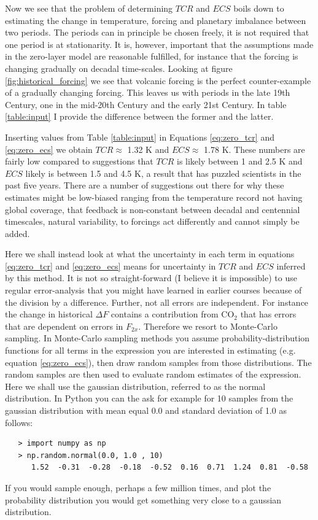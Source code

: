 \documentclass[12pt]{book}
\begin{document}
\noindent
Now we see that the problem of determining $TCR$ and $ECS$ boils down to estimating the change in temperature, forcing and planetary imbalance between two periods. The periods can in principle be chosen freely, it is not required that one period is at stationarity. It is, however, important that the assumptions made in the zero-layer model are reasonable fulfilled, for instance that the forcing is changing gradually on decadal time-scales. Looking at figure \ref{fig:historical_forcing} we see that volcanic forcing is the perfect counter-example of a gradually changing forcing. This leaves us with periods in the late 19th Century, one in the mid-20th Century and the early 21st Century. In table \ref{table:input} I provide the difference between the former and the latter. 


Inserting values from Table \ref{table:input} in Equations \ref{eq:zero_tcr} and \ref{eq:zero_ecs} we obtain $TCR \approx$ 1.32 K and $ECS \approx$ 1.78 K. These numbers are fairly low compared to suggestions that $TCR$ is likely between 1 and 2.5 K and $ECS$ likely is between 1.5 and 4.5 K, a result that has puzzled scientists in the past five years. There are a number of suggestions out there for why these estimates might be low-biased ranging from the temperature record not having global coverage, that feedback is non-constant between decadal and centennial timescales, natural variability, to forcings act differently and cannot simply be added.

Here we shall instead look at what the uncertainty in each term in equations  \ref{eq:zero_tcr} and \ref{eq:zero_ecs} means for uncertainty in $TCR$ and $ECS$ inferred by this method. It is not so straight-forward (I believe it is impossible) to use regular error-analysis that you might have learned in earlier courses because of the division by a difference. Further, not all errors are independent. For instance the change in historical $\Delta F$ contains a contribution from CO$_2$ that has errors that are dependent on errors in $F_{2x}$. Therefore we resort to Monte-Carlo sampling.
In Monte-Carlo sampling methods you assume probability-distribution functions for all terms in the expression you are interested in estimating (e.g. equation \ref{eq:zero_ecs}), then draw random samples from those distributions. The random samples are then used to evaluate random estimates of the expression. Here we shall use the gaussian distribution, referred to as the normal distribution. In Python you can the ask for example for 10 samples from the gaussian distribution with mean equal 0.0 and standard deviation of 1.0 as follows:
\begin{verbatim}
   > import numpy as np
   > np.random.normal(0.0, 1.0 , 10)
      1.52  -0.31  -0.28  -0.18  -0.52  0.16  0.71  1.24  0.81  -0.58 
\end{verbatim}
If you would sample enough, perhaps a few million times, and plot the probability distribution you would get something very close to a gaussian distribution.
\end{document}
